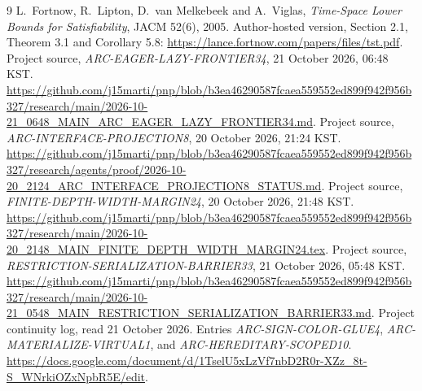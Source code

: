 \documentclass[11pt]{article}
\begin{document}
\begin{thebibliography}{9}\small
{}
L.~Fortnow, R.~Lipton, D.~van Melkebeek and A.~Viglas,
\emph{Time-Space Lower Bounds for Satisfiability}, JACM 52(6), 2005.
Author-hosted version, Section 2.1, Theorem 3.1 and Corollary 5.8:
\url{https://lance.fortnow.com/papers/files/tst.pdf}.
Project source, \emph{ARC-EAGER-LAZY-FRONTIER34}, 21 October 2026, 06:48 KST.
\url{https://github.com/j15marti/pnp/blob/b3ea46290587fcaea559552ed899f942f956b327/research/main/2026-10-21_0648_MAIN_ARC_EAGER_LAZY_FRONTIER34.md}.
Project source, \emph{ARC-INTERFACE-PROJECTION8}, 20 October 2026, 21:24 KST.
\url{https://github.com/j15marti/pnp/blob/b3ea46290587fcaea559552ed899f942f956b327/research/agents/proof/2026-10-20_2124_ARC_INTERFACE_PROJECTION8_STATUS.md}.
Project source, \emph{FINITE-DEPTH-WIDTH-MARGIN24}, 20 October 2026, 21:48 KST.
\url{https://github.com/j15marti/pnp/blob/b3ea46290587fcaea559552ed899f942f956b327/research/main/2026-10-20_2148_MAIN_FINITE_DEPTH_WIDTH_MARGIN24.tex}.
Project source, \emph{RESTRICTION-SERIALIZATION-BARRIER33}, 21 October 2026, 05:48 KST.
\url{https://github.com/j15marti/pnp/blob/b3ea46290587fcaea559552ed899f942f956b327/research/main/2026-10-21_0548_MAIN_RESTRICTION_SERIALIZATION_BARRIER33.md}.
Project continuity log, read 21 October 2026. Entries
\emph{ARC-SIGN-COLOR-GLUE4}, \emph{ARC-MATERIALIZE-VIRTUAL1},
and \emph{ARC-HEREDITARY-SCOPED10}.
\url{https://docs.google.com/document/d/1TselU5xLzVf7nbD2R0r-XZz_8t-S_WNrkiOZxNpbR5E/edit}.
\end{thebibliography}
\end{document}
